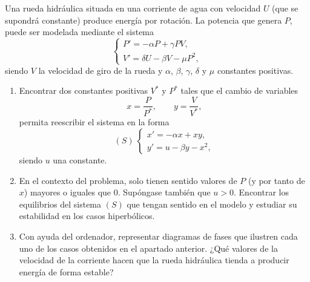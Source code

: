 \documentclass[11pt]{report}
\begin{document}
\begin{exercise}[Junio de 2024]
    Una rueda hidráulica situada en una corriente de agua con velocidad $U$ (que se supondrá constante) produce energía por rotación. La potencia que genera $P$, puede ser modelada mediante el sistema
    \[\begin{cases}
        P' = -\alpha P + \gamma PV, \\
        V' = \delta U-\beta V-\mu P^2,
    \end{cases}\]
    siendo $V$ la velocidad de giro de la rueda y $\alpha$, $\beta$, $\gamma$, $\delta$ y $\mu$ constantes positivas.
    \begin{enumerate}
        \item Encontrar dos constantes positivas $V^*$ y $P^*$ tales que el cambio de variables
        \[x = \frac{P}{P^*}, \qquad y = \frac{V}{V^*},\]
        permita reescribir el sistema en la forma
        \[(S) \ \begin{cases}
            x' = -\alpha x + xy, \\
            y' = u-\beta y-x^2,
        \end{cases}\]
        siendo $u$ una constante.
        \item En el contexto del problema, solo tienen sentido valores de $P$ (y por tanto de $x$) mayores o iguales que $0$. Supóngase también que $u > 0$. Encontrar los equilibrios del sistema $(S)$ que tengan sentido en el modelo y estudiar su estabilidad en los casos hiperbólicos.
        \item Con ayuda del ordenador, representar diagramas de fases que ilustren cada uno de los casos obtenidos en el apartado anterior. ¿Qué valores de la velocidad de la corriente hacen que la rueda hidráulica tienda a producir energía de forma estable?
    \end{enumerate}
\end{exercise}
\end{document}

